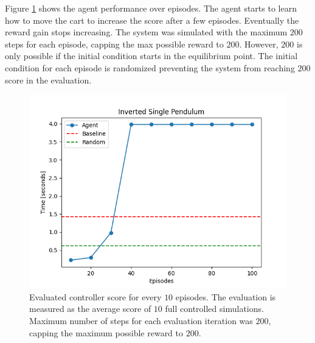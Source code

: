 \documentclass[final]{LTHtwocol} %
\begin{document}
Figure \ref{fig:single_pendulum_eval} shows the agent performance over episodes.
The agent starts to learn how to move the cart to increase the score after a few episodes.
Eventually the reward gain stops increasing.
The system was simulated with the maximum $200$ steps for each episode, capping the max possible reward to $200$.
However, $200$ is only possible if the initial condition starts in the equilibrium point.
The initial condition for each episode is randomized preventing the system from reaching $200$ score in the evaluation.

\begin{figure}[htp]
	\centering
	\includegraphics[width=0.9\columnwidth]{figures/SinglePendulum_evaluation_time.png}
	\caption{Evaluated controller score for every $10$ episodes. The evaluation is measured as the average score of $10$ full controlled simulations. Maximum number of steps for each evaluation iteration was $200$, capping the maximum possible reward to $200$.}
	\label{fig:single_pendulum_eval}
\end{figure}

%
\end{document}
